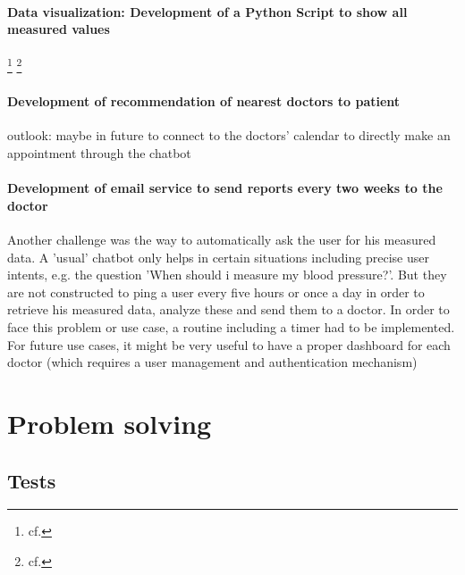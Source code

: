 \paragraph{Data visualization: Development of a Python Script to show all measured values}
\footnote{cf.\autocite{kaggle}}
\footnote{cf.\autocite{decision_tree_python}}


\paragraph{Development of recommendation of nearest doctors to patient}
outlook: maybe in future to connect to the doctors' calendar to directly make an appointment through the chatbot

\paragraph{Development of email service to send reports every two weeks to the doctor}

Another challenge was the way to automatically ask the user for his measured data. A 'usual' chatbot only helps in certain situations including precise user intents, e.g. the question 'When should i measure my blood pressure?'. But they are not constructed to ping a user every five hours or once a day in order to retrieve his measured data, analyze these and send them to a doctor. 
In order to face this problem or use case, a routine including a timer had to be implemented.
For future use cases, it might be very useful to have a proper dashboard for each doctor (which requires a user management and authentication mechanism) 

\section{Problem solving}
\subsection{Tests}
